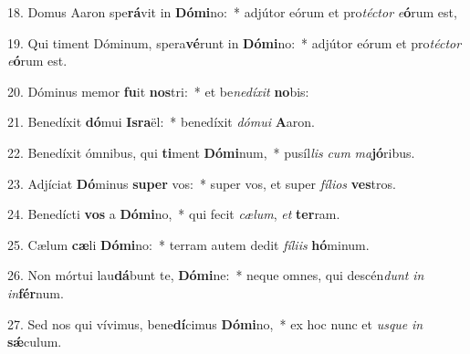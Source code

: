 18. Domus Aaron spe\textbf{rá}vit in \textbf{Dó}\textbf{mi}no:~*  adjútor eórum et pro\textit{téc}\textit{tor} \textit{e}\textbf{ó}rum est,\

19. Qui timent Dóminum, spera\textbf{vé}runt in \textbf{Dó}\textbf{mi}no:~*  adjútor eórum et pro\textit{téc}\textit{tor} \textit{e}\textbf{ó}rum est.\

20. Dóminus memor \textbf{fu}it \textbf{nos}tri:~*  et be\textit{ne}\textit{dí}\textit{xit} \textbf{no}bis:\

21. Benedíxit \textbf{dó}mui \textbf{Is}\textbf{ra}ël:~*  benedíxit \textit{dó}\textit{mu}\textit{i} \textbf{A}aron.\

22. Benedíxit ómnibus, qui \textbf{ti}ment \textbf{Dó}\textbf{mi}num,~*  pusíl\textit{lis} \textit{cum} \textit{ma}\textbf{jó}ribus.\

23. Adjíciat \textbf{Dó}minus \textbf{su}\textbf{per} vos:~*  super vos, et super \textit{fí}\textit{li}\textit{os} \textbf{ves}tros.\

24. Benedícti \textbf{vos} a \textbf{Dó}\textbf{mi}no,~*  qui fecit \textit{cæ}\textit{lum}, \textit{et} \textbf{ter}ram.\

25. Cælum \textbf{cæ}li \textbf{Dó}\textbf{mi}no:~*  terram autem dedit \textit{fí}\textit{li}\textit{is} \textbf{hó}minum.\

26. Non mórtui lau\textbf{dá}bunt te, \textbf{Dó}\textbf{mi}ne:~*  neque omnes, qui descén\textit{dunt} \textit{in} \textit{in}\textbf{fér}num.\

27. Sed nos qui vívimus, bene\textbf{dí}cimus \textbf{Dó}\textbf{mi}no,~*  ex hoc nunc et \textit{us}\textit{que} \textit{in} \textbf{sǽ}culum.\

